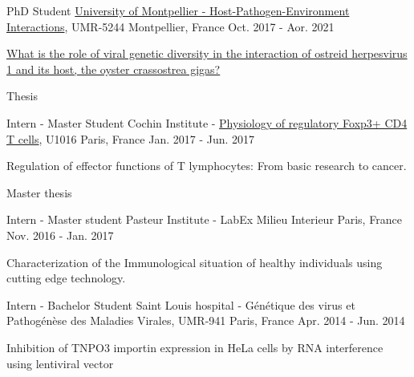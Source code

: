 \begin{cventries}
  \cventry
    {PhD Student}%
    {\href{http://ihpe.univ-perp.fr/}{University of Montpellier - Host-Pathogen-Environment Interactions}, UMR-5244} %
    {Montpellier, France} %
    {Oct. 2017 - Aor. 2021} %
    {
      \begin{cvitems} %
        \item {\href{https://www.theses.fr/2021MONTG012}{What is the role of viral genetic diversity in the interaction of ostreid herpesvirus 1 and its host, the oyster crassostrea gigas?}}
        \item {Thesis}
      \end{cvitems}
    }
    
  \cventry
    {Intern - Master Student}%
    {Cochin Institute - \href{https://www.institutcochin.fr/departments/3i/team-lucas/physiology-of-regulatory-foxp3-cd4-t-cells}{Physiology of regulatory Foxp3+ CD4 T cells}, U1016} %
    {Paris, France} %
    {Jan. 2017 - Jun. 2017} %
    {
      \begin{cvitems} %
        \item {Regulation of effector functions of T lymphocytes: From basic research to cancer.}
        \item {Master thesis}
      \end{cvitems}
    }

%


  \cventry
    {Intern - Master student} %
    {Pasteur Institute - LabEx Milieu Interieur} %
    {Paris, France} %
    {Nov. 2016 - Jan. 2017} %
    {
      \begin{cvitems} %
        \item {Characterization of the Immunological situation of healthy individuals using cutting edge technology.}
      \end{cvitems}
    }

  \cventry
    {Intern - Bachelor Student} %
    {Saint Louis hospital - Génétique des virus et Pathogénèse des Maladies Virales, UMR-941} %
    {Paris, France} %
    {Apr. 2014 - Jun. 2014} %
    {
      \begin{cvitems} %
        \item {Inhibition of TNPO3 importin expression in HeLa cells by RNA interference using  lentiviral vector}
      \end{cvitems}
    }


\end{cventries}
